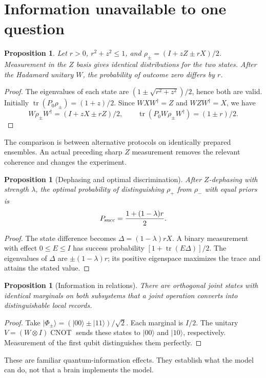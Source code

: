 \documentclass[11pt,a4paper]{article}
\newtheorem{proposition}[theorem]{Proposition}
\theoremstyle{definition}
\newcommand{\tr}{\operatorname{tr}}
\newcommand{\ket}[1]{|#1\rangle}
\begin{document}
\section{Information unavailable to one question}
\begin{proposition}\label{prop:hidden}
Let $r>0$, $r^2+z^2\le1$, and $\rho_\pm=(I+zZ\pm rX)/2$. Measurement in the $Z$ basis gives identical distributions for the two states. After the Hadamard unitary $W$, the probability of outcome zero differs by $r$.
\end{proposition}
\begin{proof}
The eigenvalues of each state are $(1\pm\sqrt{r^2+z^2})/2$, hence both are valid. Initially $\tr(P_0\rho_\pm)=(1+z)/2$. Since $WXW^\dagger=Z$ and $WZW^\dagger=X$, we have
\[
 W\rho_\pm W^\dagger=(I+zX\pm rZ)/2,
 \qquad\tr(P_0W\rho_\pm W^\dagger)=(1\pm r)/2.
\]
\end{proof}
The comparison is between alternative protocols on identically prepared ensembles. An actual preceding sharp $Z$ measurement removes the relevant coherence and changes the experiment.

\begin{proposition}[Dephasing and optimal discrimination]
After $Z$-dephasing with strength $\lambda$, the optimal probability of distinguishing $\rho_+$ from $\rho_-$ with equal priors is
\[
 P_{\rm succ}={1+(1-\lambda)r\over2}.
\]
\end{proposition}
\begin{proof}
The state difference becomes $\Delta=(1-\lambda)rX$. A binary measurement with effect $0\le E\le I$ has success probability $[1+\tr(E\Delta)]/2$. The eigenvalues of $\Delta$ are $\pm(1-\lambda)r$; its positive eigenspace maximizes the trace and attains the stated value.
\end{proof}

\begin{proposition}[Information in relations]
There are orthogonal joint states with identical marginals on both subsystems that a joint operation converts into distinguishable local records.
\end{proposition}
\begin{proof}
Take $\ket{\Phi_\pm}=(\ket{00}\pm\ket{11})/\sqrt2$. Each marginal is $I/2$. The unitary $V=(W\otimes I)\operatorname{CNOT}$ sends these states to $\ket{00}$ and $\ket{10}$, respectively. Measurement of the first qubit distinguishes them perfectly.
\end{proof}
These are familiar quantum-information effects. They establish what the model can do, not that a brain implements the model.
\end{document}
